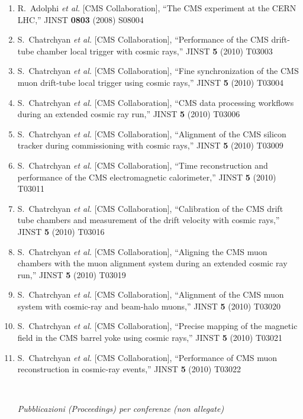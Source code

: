 \documentclass[10pt]{letter}
\begin{document}
\begin{enumerate}
\item R.~Adolphi {\it et al.}  [CMS Collaboration],
  ``The CMS experiment at the CERN LHC,''
  JINST {\bf 0803} (2008) S08004
\item S.~Chatrchyan {\it et al.}  [CMS Collaboration],
  ``Performance of the CMS drift-tube chamber local trigger with cosmic rays,''
  JINST {\bf 5} (2010) T03003
\item S.~Chatrchyan {\it et al.}  [CMS Collaboration],
  ``Fine synchronization of the CMS muon drift-tube local trigger using cosmic rays,''
  JINST {\bf 5} (2010) T03004
\item S.~Chatrchyan {\it et al.}  [CMS Collaboration],
  ``CMS data processing workflows during an extended cosmic ray run,''
  JINST {\bf 5} (2010) T03006
\item S.~Chatrchyan {\it et al.}  [CMS Collaboration],
  ``Alignment of the CMS silicon tracker during commissioning with cosmic rays,''
  JINST {\bf 5} (2010) T03009
\item S.~Chatrchyan {\it et al.}  [CMS Collaboration],
  ``Time reconstruction and performance of the CMS electromagnetic calorimeter,''
  JINST {\bf 5} (2010) T03011
\item S.~Chatrchyan {\it et al.}  [CMS Collaboration],
  ``Calibration of the CMS drift tube chambers and measurement of the drift velocity with cosmic rays,''
  JINST {\bf 5} (2010) T03016
\item S.~Chatrchyan {\it et al.}  [CMS Collaboration],
  ``Aligning the CMS muon chambers with the muon alignment system during an extended cosmic ray run,''
  JINST {\bf 5} (2010) T03019
\item S.~Chatrchyan {\it et al.}  [CMS Collaboration],
  ``Alignment of the CMS muon system with cosmic-ray and beam-halo muons,''
  JINST {\bf 5} (2010) T03020
\item S.~Chatrchyan {\it et al.}  [CMS Collaboration],
  ``Precise mapping of the magnetic field in the CMS barrel yoke using cosmic rays,''
  JINST {\bf 5} (2010) T03021
\item S.~Chatrchyan {\it et al.}  [CMS Collaboration],
  ``Performance of CMS muon reconstruction in cosmic-ray events,''
  JINST {\bf 5} (2010) T03022

~\\
\begin{center} \textit{Pubblicazioni (Proceedings) per conferenze (non allegate)} \\ \end{center}


\end{enumerate}
\end{document}
